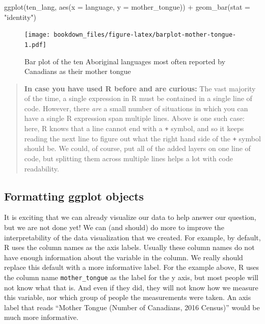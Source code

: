 \documentclass[
]{book}
\newenvironment{Shaded}{\begin{snugshade}}{\end{snugshade}}
\newcommand{\AttributeTok}[1]{\textcolor[rgb]{0.61,0.61,0.61}{#1}}
\newcommand{\FunctionTok}[1]{\textcolor[rgb]{0,0,0}{#1}}
\newcommand{\NormalTok}[1]{#1}
\newcommand{\SpecialCharTok}[1]{\textcolor[rgb]{0,0,0}{#1}}
\newcommand{\StringTok}[1]{\textcolor[rgb]{0.5,0.5,0.5}{#1}}
\begin{document}
\begin{Shaded}
\begin{Highlighting}[]
\FunctionTok{ggplot}\NormalTok{(ten\_lang, }\FunctionTok{aes}\NormalTok{(}\AttributeTok{x =}\NormalTok{ language, }\AttributeTok{y =}\NormalTok{ mother\_tongue)) }\SpecialCharTok{+}
  \FunctionTok{geom\_bar}\NormalTok{(}\AttributeTok{stat =} \StringTok{"identity"}\NormalTok{)}
\end{Highlighting}
\end{Shaded}

\begin{figure}
\centering
\texttt{[image: bookdown\_files/figure-latex/barplot-mother-tongue-1.pdf]}
\caption{\label{fig:barplot-mother-tongue}Bar plot of the ten Aboriginal languages most often reported by Canadians as their mother tongue}
\end{figure}

\begin{quote}
\textbf{In case you have used R before and are curious:} The vast majority of the
time, a single expression in R must be contained in a single line of code.
However, there \emph{are} a small number of situations in which you can have a
single R expression span multiple lines. Above is one such case: here, R knows that a line cannot
end with a \texttt{+} symbol,  and so it keeps reading the next line to figure out
what the right hand side of the \texttt{+} symbol should be. We could, of course,
put all of the added layers on one line of code, but splitting them across
multiple lines helps a lot with code readability. 
\end{quote}

\hypertarget{formatting-ggplot-objects}{%
\subsection{Formatting ggplot objects}\label{formatting-ggplot-objects}}

It is exciting that we can already visualize our data to help answer our
question, but we are not done yet! We can (and should) do more to improve the
interpretability of the data visualization that we created. For example, by
default, R uses the column names as the axis labels. Usually these
column names do not have enough information about the variable in the column.
We really should replace this default with a more informative label. For the
example above, R uses the column name \texttt{mother\_tongue} as the label for the
y axis, but most people will not know what that is. And even if they did, they
will not know how we measure this variable, nor which group of people the
measurements were taken. An axis label that reads ``Mother Tongue (Number of
Canadians, 2016 Census)'' would be much more informative.
\end{document}
